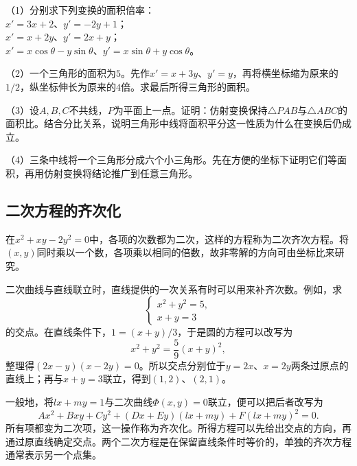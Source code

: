 \newpage
\begin{exercise}
\mbox{}

\begin{samepage}
（1）分别求下列变换的面积倍率：\\
\(x'=3x+2\)、\(y'=-2y+1\)；\\
\(x'=x+2y\)、\(y'=2x+y\)；\\
\(x'=x\cos\theta-y\sin\theta\)、\(y'=x\sin\theta+y\cos\theta\)。
\par
\end{samepage}

（2）一个三角形的面积为\(5\)。先作\(x'=x+3y\)、\(y'=y\)，再将横坐标缩为原来的\(1/2\)，纵坐标伸长为原来的\(4\)倍。求最后所得三角形的面积。

（3）设\(A,B,C\)不共线，\(P\)为平面上一点。证明：仿射变换保持\(\triangle PAB\)与\(\triangle ABC\)的面积比。结合分比关系，说明三角形中线将面积平分这一性质为什么在变换后仍成立。

（4）三条中线将一个三角形分成六个小三角形。先在方便的坐标下证明它们等面积，再用仿射变换将结论推广到任意三角形。
\end{exercise}

\subsection{二次方程的齐次化}
\label{subsec:quadratic-homogenization}

在\(x^2+xy-2y^2=0\)中，各项的次数都为二次，这样的方程称为{\heiti{}二次齐次方程}。将\((x,y)\)同时乘以一个数，各项乘以相同的倍数，故非零解的方向可由坐标比来研究。

二次曲线与直线联立时，直线提供的一次关系有时可以用来补齐次数。例如，求
\begin{equation*}
    \begin{cases}
        x^2+y^2=5 ,\\
        x+y=3
    \end{cases}
\end{equation*}
的交点。在直线条件下，\(1=(x+y)/3\)，于是圆的方程可以改写为
\begin{equation*}
    x^2+y^2=\frac59(x+y)^2 ,
\end{equation*}
整理得\((2x-y)(x-2y)=0\)。所以交点分别位于\(y=2x\)、\(x=2y\)两条过原点的直线上；再与\(x+y=3\)联立，得到\((1,2)\)、\((2,1)\)。

一般地，将\(lx+my=1\)与二次曲线\(\Phi(x,y)=0\)联立，便可以把后者改写为
\begin{equation}\label{eq:quadratic-line-homogenization}
    Ax^2+Bxy+Cy^2+(Dx+Ey)(lx+my)+F(lx+my)^2=0 .
\end{equation}
所有项都变为二次项，这一操作称为{\heiti{}齐次化}。所得方程可以先给出交点的方向，再通过原直线确定交点。两个二次方程是在保留直线条件时等价的，单独的齐次方程通常表示另一个点集。


